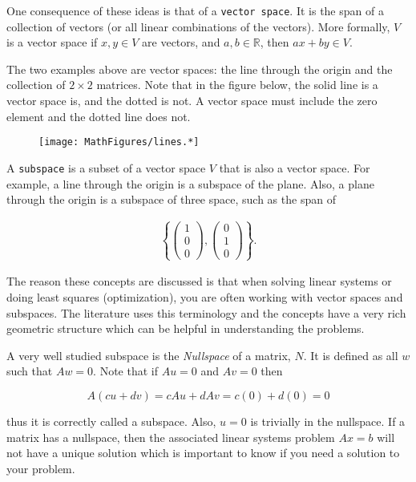 One consequence of these ideas is that of a \texttt{vector\ space}. It
is the span of a collection of vectors (or all linear combinations of
the vectors). More formally, \(V\) is a vector space if \(x, y\in V\)
are vectors, and \(a, b\in {\mathbb R}\), then \(ax+by \in V\).

The two examples above are vector spaces: the line through the origin
and the collection of \(2\times 2\) matrices. Note that in the figure
below, the solid line is a vector space is, and the dotted is not. A
vector space must include the zero element and the dotted line does not.

\leavevmode\hypertarget{fig:lineisnotalwaysvectorspace}{}%
\begin{figure}
\centering
\texttt{[image: MathFigures/lines.*]}
\caption{}
\end{figure}

A \texttt{subspace} is a subset of a vector space \(V\) that is also a
vector space. For example, a line through the origin is a subspace of
the plane. Also, a plane through the origin is a subspace of three
space, such as the span of

\[\begin{aligned}
\left\{\begin{pmatrix} 1 \\ 0 \\ 0\end{pmatrix},
\begin{pmatrix} 0 \\ 1 \\ 0\end{pmatrix}\right\}.
\end{aligned}\]

The reason these concepts are discussed is that when solving linear
systems or doing least squares (optimization), you are often working
with vector spaces and subspaces. The literature uses this terminology
and the concepts have a very rich geometric structure which can be
helpful in understanding the problems.

A very well studied subspace is the \emph{Nullspace} of a matrix, \(N\).
It is defined as all \(w\) such that \(Aw=0\). Note that if \(Au=0\) and
\(Av=0\) then

\[A(cu+dv) = cAu + dAv = c(0) + d(0) = 0\]

thus it is correctly called a subspace. Also, \(u=0\) is trivially in
the nullspace. If a matrix has a nullspace, then the associated linear
systems problem \(Ax = b\) will not have a unique solution which is
important to know if you need a solution to your problem.

